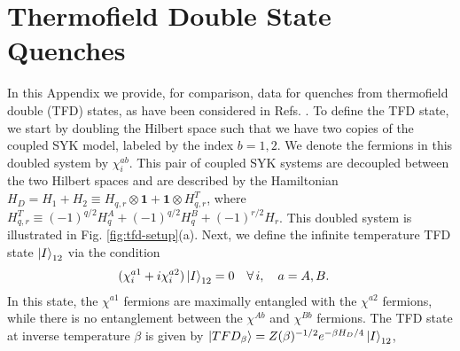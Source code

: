 \documentclass[reprint, floatfix,eqsecnum,superscriptaddress,preprint,nofootinbib,onecolumn,amsmath,amssymb,aps,prb]{revtex4-2}
\begin{document}
\appendix

\section{Thermofield Double State Quenches \label{app:thermofield-double} }

In this Appendix we provide, for comparison, data for quenches from thermofield double (TFD) states, as have been considered in Refs. \cite{Penington2019,Chen2020,Jian2021}.
To define the TFD state, we start by doubling the Hilbert space such that we have two copies of the coupled SYK model, labeled by the index $b = 1,2$. We denote the fermions in this doubled system by $\chi_i^{ab}$. This pair of coupled SYK systems are decoupled between the two Hilbert spaces and are described by the Hamiltonian
	$H_D = H_1 + H_2 \equiv H_{q,r} \otimes \mathbf{1} + \mathbf{1} \otimes H_{q,r}^T$,  %
where %
	$H_{q,r}^T \equiv (-1)^{q/2} H_q^A + (-1)^{q/2} H_q^B + (-1)^{r/2} H_r$.
This doubled system is illustrated in Fig. \ref{fig:tfd-setup}(a).
Next, we define the infinite temperature TFD state $\ket{I}_{12}$ via the condition
\begin{align}
	(\chi_{i}^{a1} + i \chi_{i}^{a2})\ket{I}_{12} &= 0 \quad \forall \, i, \quad a=A,B. \label{eqn:tfd-inf-temp-cnd}
\end{align}
In this state, the $\chi^{a1}$ fermions are maximally entangled with the $\chi^{a2}$ fermions, while there is no entanglement between the $\chi^{Ab}$ and $\chi^{Bb}$ fermions. 
The TFD state at inverse temperature $\beta$ is given by $\ket{TFD_{\beta}} = Z(\beta)^{-1/2} e^{-\beta H_D/4} \ket{I}_{12}$, 
\end{document}
